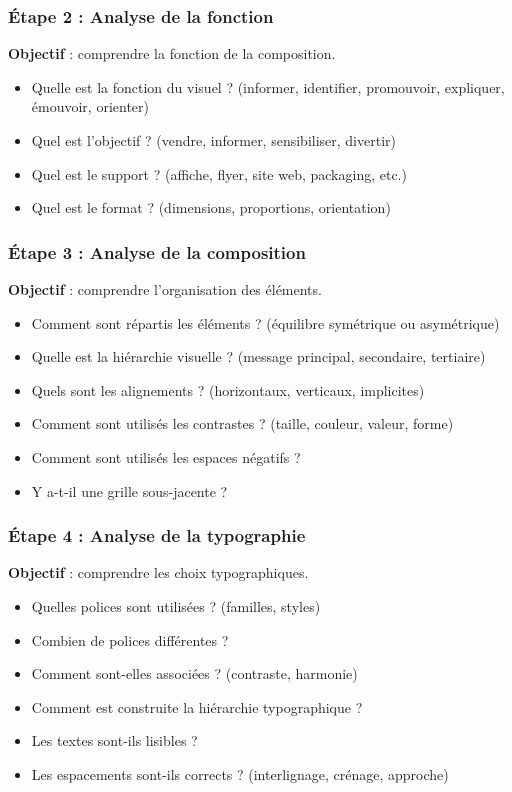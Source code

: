 \subsubsection{Étape 2 : Analyse de la fonction}

\textbf{Objectif} : comprendre la fonction de la composition.

\begin{itemize}
    \item Quelle est la fonction du visuel ? (informer, identifier, promouvoir, expliquer, émouvoir, orienter)
    \item Quel est l'objectif ? (vendre, informer, sensibiliser, divertir)
    \item Quel est le support ? (affiche, flyer, site web, packaging, etc.)
    \item Quel est le format ? (dimensions, proportions, orientation)
\end{itemize}

\subsubsection{Étape 3 : Analyse de la composition}

\textbf{Objectif} : comprendre l'organisation des éléments.

\begin{itemize}
    \item Comment sont répartis les éléments ? (équilibre symétrique ou asymétrique)
    \item Quelle est la hiérarchie visuelle ? (message principal, secondaire, tertiaire)
    \item Quels sont les alignements ? (horizontaux, verticaux, implicites)
    \item Comment sont utilisés les contrastes ? (taille, couleur, valeur, forme)
    \item Comment sont utilisés les espaces négatifs ?
    \item Y a-t-il une grille sous-jacente ?
\end{itemize}

\subsubsection{Étape 4 : Analyse de la typographie}

\textbf{Objectif} : comprendre les choix typographiques.

\begin{itemize}
    \item Quelles polices sont utilisées ? (familles, styles)
    \item Combien de polices différentes ?
    \item Comment sont-elles associées ? (contraste, harmonie)
    \item Comment est construite la hiérarchie typographique ?
    \item Les textes sont-ils lisibles ?
    \item Les espacements sont-ils corrects ? (interlignage, crénage, approche)
\end{itemize}

